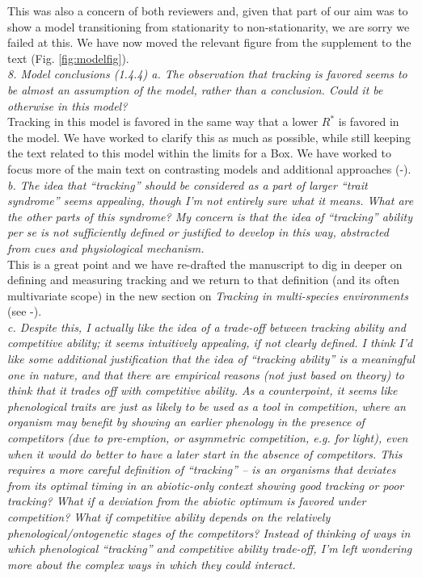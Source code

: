 \documentclass[11pt]{article}
\begin{document}
This was also a concern of both reviewers and, given that part of our aim was to show a model transitioning from stationarity to non-stationarity, we are sorry we failed at this. We have now moved the relevant figure from the supplement to the text (Fig. \ref{fig:modelfig}). \\

\emph{8.      Model conclusions (1.4.4)
a.      The observation that tracking is favored seems to be almost an assumption of the
model, rather than a conclusion. Could it be otherwise in this model?}\\

Tracking in this model is favored in the same way that a lower $R^*$ is favored in the model. We have worked to clarify this as much as possible, while still keeping the text related to this model within the limits for a Box. We have worked to focus more of the main text on contrasting models and additional approaches (-).\\


\emph{b.      The idea that ``tracking'' should be considered as a part of larger ``trait syndrome''
seems appealing, though I'm not entirely sure what it means. What are the other parts of this
syndrome? My concern is that the idea of ``tracking'' ability per se is not sufficiently
defined or justified to develop in this way, abstracted from cues and physiological
mechanism.}\\

This is a great point and we have re-drafted the manuscript to dig in deeper on defining and measuring tracking and we return to that definition (and its often multivariate scope) in the new section on \emph{Tracking in multi-species environments} (see -).\\

\emph{c.      Despite this, I actually like the idea of a trade-off between tracking ability and
competitive ability; it seems intuitively appealing, if not clearly defined. I think I'd like
some additional justification that the idea of ``tracking ability'' is a meaningful one in
nature, and that there are empirical reasons (not just based on theory) to think that it
trades off with competitive ability. As a counterpoint, it seems like phenological traits are
just as likely to be used as a tool in competition, where an organism may benefit by showing
an earlier phenology in the presence of competitors (due to pre-emption, or asymmetric
competition, e.g. for light), even when it would do better to have a later start in the
absence of competitors. This requires a more careful definition of ``tracking'' – is an
organisms that deviates from its optimal timing in an abiotic-only context showing good
tracking or poor tracking?  What if a deviation from the abiotic optimum is favored under
competition? What if competitive ability depends on the relatively phenological/ontogenetic
stages of the competitors? Instead of thinking of ways in which phenological “tracking” and
competitive ability trade-off, I'm left wondering more about the complex ways in which they
could interact.}\\
\end{document}
